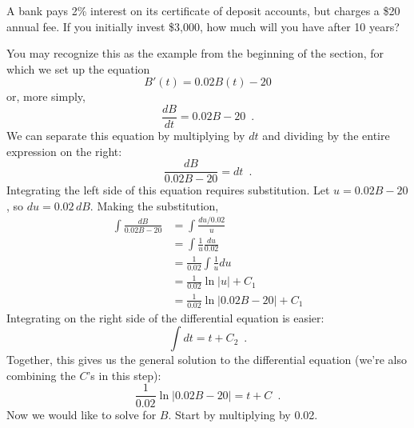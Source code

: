 \begin{example}
A bank pays 2\% interest on its certificate of deposit accounts, but charges a \$20 annual fee. If you initially invest \$3,000, how much will you have after 10 years?

\begin{solution}
  You may recognize this as the example from the beginning of the section, for which we set up the equation $$B'(t)=0.02B(t)-20$$ or, more simply,
$$\frac{dB}{dt}=0.02B-20 \enspace .$$
We can separate this equation by multiplying by $dt$ and dividing by the entire expression on the right:
$$\frac{dB}{0.02B-20}=dt \enspace .$$
Integrating the left side of this equation requires substitution. Let $u=0.02B-20$, so $du=0.02\,dB$. Making the substitution,
\begin{align*}
  \int \frac{dB}{0.02B-20} &=\int \frac{du/0.02}{u} \\
    &= \int \frac{1}{u}\frac{du}{0.02} \\
    &= \frac{1}{0.02}\int \frac{1}{u}du \\
    &= \frac{1}{0.02}\ln|u| + C_1 \\
    &= \frac{1}{0.02}\ln|0.02B-20| + C_1
\end{align*}
Integrating on the right side of the differential equation is easier:
$$\int dt=t+C_2 \enspace .$$
Together, this gives us the general solution to the differential equation (we're also combining the $C$'s in this step):
$$\frac{1}{0.02}\ln|0.02B-20|=t+C \enspace .$$
Now we would like to solve for $B$. Start by multiplying by 0.02.


\end{solution}
\end{example}
